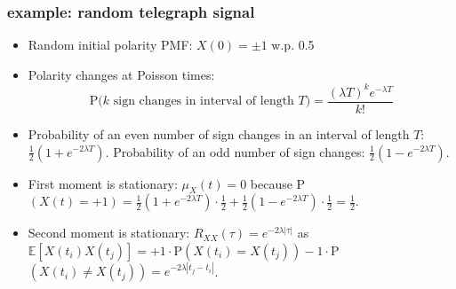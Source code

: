 \documentclass{beamer}
\begin{document}
\begin{frame}[fragile]
	\frametitle{example: random telegraph signal}
	\begin{itemize}
		\item Random initial polarity PMF: $X(0) = \pm 1$ w.p. 0.5

		\item Polarity changes at Poisson times: \begin{equation*}
				\text{P(}k\text{ sign changes in interval of length }T) = \frac{(\lambda T)^k e^{-\lambda T}}{k!}
		\end{equation*}
	\item Probability of an even number of sign changes in an interval of length $T$: $\frac{1}{2}(1+e^{-2\lambda T}).$ Probability of an odd number of sign changes: $\frac{1}{2}(1-e^{-2\lambda T})$.
	\item First moment is stationary: $\mu_X(t) = 0$ because P$(X(t)=+1)  = \frac{1}{2}(1+e^{-2\lambda T})\cdot \frac{1}{2} + \frac{1}{2}(1-e^{-2\lambda T})\cdot\frac{1}{2} = \frac{1}{2}.$
	\item Second moment is stationary: $R_{XX}(\tau) = e^{-2\lambda |\tau|}$ as $\mathbb{E}[X(t_i)X(t_j)] = +1\cdot $P$(X(t_i) = X(t_j)) -1\cdot $P$(X(t_i) \neq X(t_j)) = e^{-2\lambda|t_j-t_i|}$.
	\end{itemize}
	\vspace{-0.4cm}
	\begin{figure}
		\centering
	\end{figure}

\end{frame}
\end{document}
